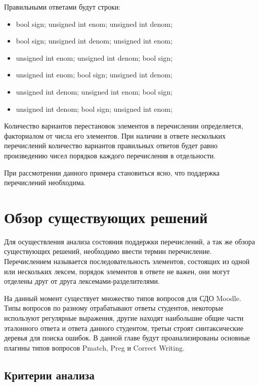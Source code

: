 \documentclass[a4paper,english,russian]{G2-105}
\begin{document}
\par Правильными ответами будут строки:
\begin{itemize}
    \item bool sign; unsigned int enom; unsigned int denom;
    \item bool sign; unsigned int denom; unsigned int enom;
    \item unsigned int enom; unsigned int denom; bool sign;
    \item unsigned int enom; bool sign; unsigned int denom;
    \item unsigned int denom; unsigned int enom; bool sign;
    \item unsigned int denom; bool sign; unsigned int enom;
\end{itemize}
\par Количество вариантов перестановок элементов в перечислении определяется, факториалом от числа его элементов. При наличии в ответе нескольких перечислений количество вариантов правильных ответов будет равно произведению чисел порядков каждого перечисления в отдельности.
\par При рассмотрении данного примера становиться ясно, что поддержка перечислений необходима.
\section{Обзор существующих решений}

\par Для осуществления анализа состояния поддержки перечислений, а так же обзора существующих решений, необходимо ввести термин перечисление. Перечислением называется последовательность элементов, состоящих из одной или нескольких лексем, порядок элементов в ответе не важен, они могут отделены друг от друга лексемами-разделителями.
\par На данный момент существует множество типов вопросов для СДО Moodle. Типы вопросов по разному отрабатывают ответы студентов, некоторые используют регулярные выражения, другие находят наибольшие общие части эталонного ответа и ответа данного студентом, третьи строят синтаксические деревья для поиска ошибок. В данной главе будут проанализированы основные плагины типов вопросов Pmatch, Preg и Correct Writing.

\subsection{Критерии анализа}
\end{document}
